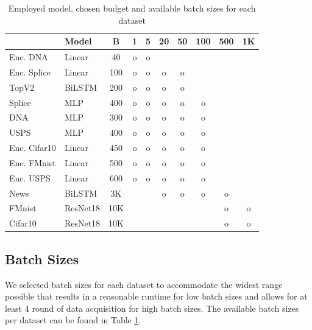 \documentclass[]{article}
\begin{document}
\begin{table}
    \vspace{-0.7cm}
    \caption{Employed model, chosen budget and available batch sizes for each dataset}
    \vspace{0.1cm}
    \label{tab:batch_sizes}
    {\scriptsize
    \begin{tabular}{l|l|c|c|c|c|c|c|c|c}
                    & Model  & B & 1 & 5 & 20 & 50 & 100 & 500 & 1K \\
        \hline
        Enc. DNA    & Linear & 40 & o & o &&&&& \\
        Enc. Splice & Linear & 100 & o & o & o & o &&&\\
        TopV2       & BiLSTM & 200 & o & o & o & o &&& \\
        Splice      & MLP    & 400 & o & o & o & o & o && \\
        DNA         & MLP    & 300 & o & o & o & o & o && \\
        USPS        & MLP    & 400 & o & o & o & o & o && \\
        Enc. Cifar10& Linear & 450 & o & o & o & o & o && \\
        Enc. FMnist & Linear & 500 & o & o & o & o & o && \\
        Enc. USPS   & Linear & 600 & o & o & o & o & o && \\
        News        & BiLSTM & 3K &&& o & o & o & o &\\
        FMnist      & ResNet18& 10K &&&&&& o & o\\
        Cifar10     & ResNet18& 10K &&&&&& o & o \\
    \end{tabular}
	}
    \vspace{-0.85cm}
\end{table}

\subsection{Batch Sizes}\label{sec:batch_sizes}
We selected batch sizes for each dataset to accommodate the widest range possible that results in a reasonable runtime for low batch sizes and allows for at least 4 round of data acquisition for high batch sizes.
The available batch sizes per dataset can be found in Table \ref{tab:batch_sizes}.

\end{document}
